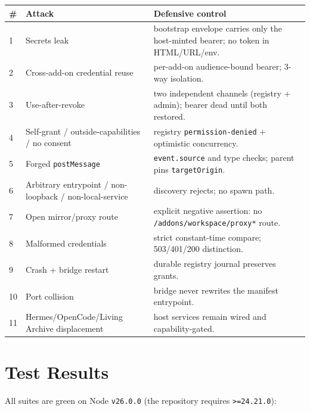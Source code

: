 \documentclass[11pt]{article}
\begin{document}
\begin{center}
\begin{tabular}{@{}p{0.9cm}p{3.6cm}p{7.7cm}@{}}
\toprule
\textbf{\#} & \textbf{Attack} & \textbf{Defensive control} \\
\midrule
1 & Secrets leak & bootstrap envelope carries only the host-minted bearer; no token in HTML/URL/env. \\
2 & Cross-add-on credential reuse & per-add-on audience-bound bearer; 3-way isolation. \\
3 & Use-after-revoke & two independent channels (registry + admin); bearer dead until both restored. \\
4 & Self-grant / outside-capabilities / no consent & registry \texttt{permission-denied} + optimistic concurrency. \\
5 & Forged \texttt{postMessage} & \texttt{event.source} and type checks; parent pins \texttt{targetOrigin}. \\
6 & Arbitrary entrypoint / non-loopback / non-local-service & discovery rejects; no spawn path. \\
7 & Open mirror/proxy route & explicit negative assertion: no \texttt{/addons/workspace/proxy*} route. \\
8 & Malformed credentials & strict constant-time compare; 503/401/200 distinction. \\
9 & Crash + bridge restart & durable registry journal preserves grants. \\
10 & Port collision & bridge never rewrites the manifest entrypoint. \\
11 & Hermes/OpenCode/Living Archive displacement & host services remain wired and capability-gated. \\
\bottomrule
\end{tabular}
\end{center}

\section{Test Results}

All suites are green on Node \texttt{v26.0.0} (the repository requires
\texttt{>=24.21.0}):
\end{document}
